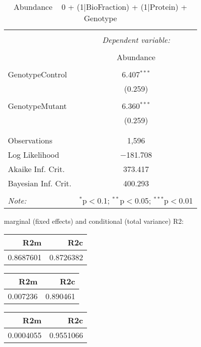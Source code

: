 \documentclass[11pt]{report}
\begin{document}
\begin{table}[!htbp] \centering 
  \caption{Abundance ~ 0 + (1|BioFraction) + (1|Protein) + Genotype} 
  \label{} 
\begin{tabular}{@{\extracolsep{5pt}}lc} 
\\[-1.8ex]\hline 
\hline \\[-1.8ex] 
 & \multicolumn{1}{c}{\textit{Dependent variable:}} \\ 
\cline{2-2} 
\\[-1.8ex] & Abundance \\ 
\hline \\[-1.8ex] 
 GenotypeControl & 6.407$^{***}$ \\ 
  & (0.259) \\ 
  & \\ 
 GenotypeMutant & 6.360$^{***}$ \\ 
  & (0.259) \\ 
  & \\ 
\hline \\[-1.8ex] 
Observations & 1,596 \\ 
Log Likelihood & $-$181.708 \\ 
Akaike Inf. Crit. & 373.417 \\ 
Bayesian Inf. Crit. & 400.293 \\ 
\hline 
\hline \\[-1.8ex] 
\textit{Note:}  & \multicolumn{1}{r}{$^{*}$p$<$0.1; $^{**}$p$<$0.05; $^{***}$p$<$0.01} \\ 
\end{tabular} 
\end{table} 
marginal (fixed effects) and conditional (total variance) R2:

\begin{tabular}{r|r}
\hline
R2m & R2c\\
\hline
0.8687601 & 0.8726382\\
\hline
\end{tabular}

\begin{tabular}{r|r}
\hline
R2m & R2c\\
\hline
0.007236 & 0.890461\\
\hline
\end{tabular}

\begin{tabular}{r|r}
\hline
R2m & R2c\\
\hline
0.0004055 & 0.9551066\\
\hline
\end{tabular}
\end{document}
